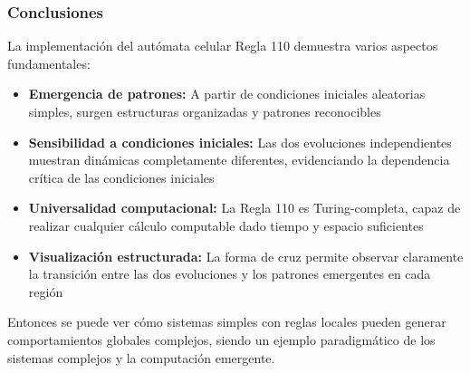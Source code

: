 \documentclass[a4paper,12pt]{article}
\theoremstyle{mytheor}
\begin{document}
\subsubsection{Conclusiones}

La implementación del autómata celular Regla 110 demuestra varios aspectos fundamentales:

\begin{itemize}
    \item \textbf{Emergencia de patrones:} A partir de condiciones iniciales aleatorias simples, surgen estructuras organizadas y patrones reconocibles
    
    \item \textbf{Sensibilidad a condiciones iniciales:} Las dos evoluciones independientes muestran dinámicas completamente diferentes, evidenciando la dependencia crítica de las condiciones iniciales
    
    \item \textbf{Universalidad computacional:} La Regla 110 es Turing-completa, capaz de realizar cualquier cálculo computable dado tiempo y espacio suficientes
    
    \item \textbf{Visualización estructurada:} La forma de cruz permite observar claramente la transición entre las dos evoluciones y los patrones emergentes en cada región
\end{itemize}

Entonces se puede ver cómo sistemas simples con reglas locales pueden generar comportamientos globales complejos, siendo un ejemplo paradigmático de los sistemas complejos y la computación emergente.
\end{document}
